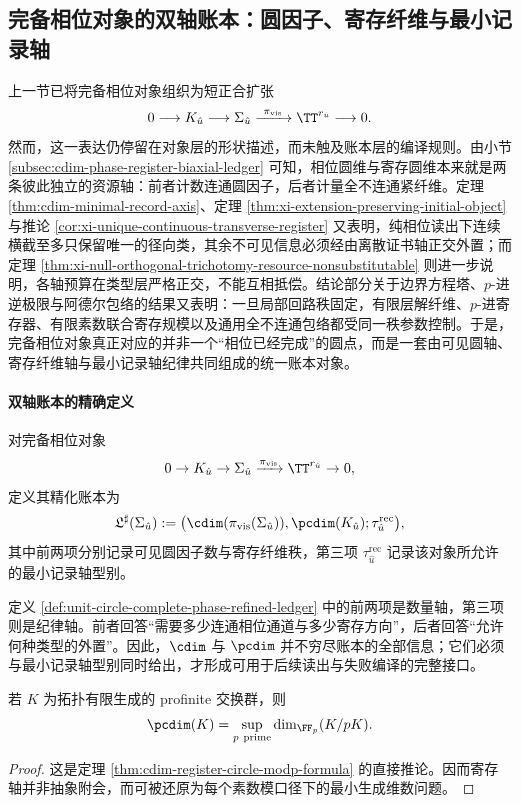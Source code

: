 \subsection{完备相位对象的双轴账本：圆因子、寄存纤维与最小记录轴}\label{subsec:unit-circle-complete-phase-ledger}
上一节已将完备相位对象组织为短正合扩张
\[
0\longrightarrow K_{\hat u}\longrightarrow \Sigma_{\hat u}
\xrightarrow{\ \pi_{\mathrm{vis}}\ } \TT^{r_{\hat u}}
\longrightarrow 0.
\]
然而，这一表达仍停留在对象层的形状描述，而未触及账本层的编译规则。由小节 \ref{subsec:cdim-phase-register-biaxial-ledger} 可知，相位圆维与寄存圆维本来就是两条彼此独立的资源轴：前者计数连通圆因子，后者计量全不连通紧纤维。定理 \ref{thm:cdim-minimal-record-axis}、定理 \ref{thm:xi-extension-preserving-initial-object} 与推论 \ref{cor:xi-unique-continuous-transverse-register} 又表明，纯相位读出下连续横截至多只保留唯一的径向类，其余不可见信息必须经由离散证书轴正交外置；而定理 \ref{thm:xi-null-orthogonal-trichotomy-resource-nonsubstitutable} 则进一步说明，各轴预算在类型层严格正交，不能互相抵偿。结论部分关于边界方程塔、\(p\)-进逆极限与阿德尔包络的结果又表明：一旦局部回路秩固定，有限层解纤维、\(p\)-进寄存器、有限素数联合寄存规模以及通用全不连通包络都受同一秩参数控制。于是，完备相位对象真正对应的并非一个“相位已经完成”的圆点，而是一套由可见圆轴、寄存纤维轴与最小记录轴纪律共同组成的统一账本对象。

\paragraph{双轴账本的精确定义}
\begin{definition}[完备相位对象的精化账本]\label{def:unit-circle-complete-phase-refined-ledger}
对完备相位对象
\[
0\to K_{\hat u}\to \Sigma_{\hat u}\xrightarrow{\pi_{\mathrm{vis}}}\TT^{r_{\hat u}}\to 0,
\]
定义其精化账本为
\[
\mathfrak L^\sharp(\Sigma_{\hat u})
:=
\bigl(
\cdim(\pi_{\mathrm{vis}}(\Sigma_{\hat u})),
\pcdim(K_{\hat u});
\tau^{\mathrm{rec}}_{\hat u}
\bigr),
\]
其中前两项分别记录可见圆因子数与寄存纤维秩，第三项 \(\tau^{\mathrm{rec}}_{\hat u}\) 记录该对象所允许的最小记录轴型别。
\end{definition}

定义 \ref{def:unit-circle-complete-phase-refined-ledger} 中的前两项是数量轴，第三项则是纪律轴。前者回答“需要多少连通相位通道与多少寄存方向”，后者回答“允许何种类型的外置”。因此，\(\cdim\) 与 \(\pcdim\) 并不穷尽账本的全部信息；它们必须与最小记录轴型别同时给出，才形成可用于后续读出与失败编译的完整接口。

\begin{proposition}[寄存圆维的模素数公式]\label{prop:unit-circle-complete-phase-pcdim-modp}
若 \(K\) 为拓扑有限生成的 profinite 交换群，则
\[
\pcdim(K)
=
\sup_{p\ \mathrm{prime}}\dim_{\FF_p}(K/pK).
\]
\end{proposition}
\begin{proof}
这是定理 \ref{thm:cdim-register-circle-modp-formula} 的直接推论。因而寄存轴并非抽象附会，而可被还原为每个素数模口径下的最小生成维数问题。
\end{proof}

